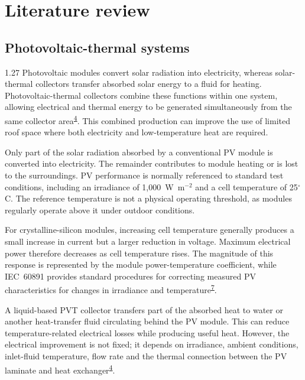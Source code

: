 \documentclass[12pt,letterpaper]{article}
\newcommand{\done}{\ \textcolor{green!45!black}{$\checkmark$}} %
\DeclareRobustCommand{\citenum}[1]{\hyperlink{ref:#1}{#1}} %
\begin{document}
\clearpage

\section{Literature review}\label{sec7}

\subsection[Photovoltaic-thermal systems\done]{Photovoltaic-thermal systems}\label{sec8}

\begin{spacing}{1.27}
Photovoltaic modules convert solar radiation into electricity, whereas solar-thermal collectors transfer absorbed solar energy to a fluid for heating. Photovoltaic-thermal collectors combine these functions within one system, allowing electrical and thermal energy to be generated simultaneously from the same collector area\textsuperscript{\citenum{4}}. This combined production can improve the use of limited roof space where both electricity and low-temperature heat are required.\par

\vspace{0.15in}

Only part of the solar radiation absorbed by a conventional PV module is converted into electricity. The remainder contributes to module heating or is lost to the surroundings. PV performance is normally referenced to standard test conditions, including an irradiance of 1,000~W~m$^{-2}$ and a cell temperature of 25$^\circ$C. The reference temperature is not a physical operating threshold, as modules regularly operate above it under outdoor conditions.\par

\vspace{0.15in}

For crystalline-silicon modules, increasing cell temperature generally produces a small increase in current but a larger reduction in voltage. Maximum electrical power therefore decreases as cell temperature rises. The magnitude of this response is represented by the module power-temperature coefficient, while IEC~60891 provides standard procedures for correcting measured PV characteristics for changes in irradiance and temperature\textsuperscript{\citenum{7}}.\par

\vspace{0.15in}

A liquid-based PVT collector transfers part of the absorbed heat to water or another heat-transfer fluid circulating behind the PV module. This can reduce temperature-related electrical losses while producing useful heat. However, the electrical improvement is not fixed; it depends on irradiance, ambient conditions, inlet-fluid temperature, flow rate and the thermal connection between the PV laminate and heat exchanger\textsuperscript{\citenum{4}}.\par
\end{spacing}
\end{document}
